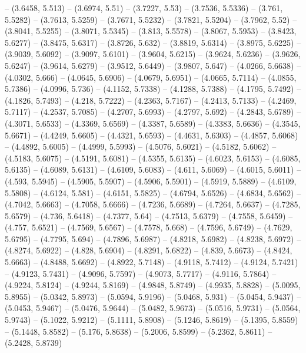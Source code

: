 {  -- (3.6458, 5.513) -- (3.6974, 5.51) -- (3.7227, 5.53) -- (3.7536, 5.5336) -- 
  (3.761, 5.5282) -- (3.7613, 5.5259) -- (3.7671, 5.5232) -- (3.7821, 5.5204) --
   (3.7962, 5.52) -- (3.8041, 5.5255) -- (3.8071, 5.5345) -- (3.813, 5.5578) -- 
  (3.8067, 5.5953) -- (3.8423, 5.6277) -- (3.8475, 5.6317) -- (3.8726, 5.632) --
   (3.8819, 5.6314) -- (3.8975, 5.6225) -- (3.9039, 5.6092) -- (3.9097, 5.6101) 
  -- (3.9604, 5.6215) -- (3.9624, 5.6236) -- (3.9626, 5.6247) -- (3.9614, 
  5.6279) -- (3.9512, 5.6449) -- (3.9807, 5.647) -- (4.0266, 5.6638) -- (4.0302,
   5.666) -- (4.0645, 5.6906) -- (4.0679, 5.6951) -- (4.0665, 5.7114) -- 
  (4.0855, 5.7386) -- (4.0996, 5.736) -- (4.1152, 5.7338) -- (4.1288, 5.7388) --
   (4.1795, 5.7492) -- (4.1826, 5.7493) -- (4.218, 5.7222) -- (4.2363, 5.7167) 
  -- (4.2413, 5.7133) -- (4.2469, 5.7117) -- (4.2537, 5.7085) -- (4.2707, 
  5.6993) -- (4.2797, 5.692) -- (4.2843, 5.6789) -- (4.3071, 5.6533) -- (4.3369,
   5.6569) -- (4.3387, 5.6589) -- (4.3383, 5.6636) -- (4.3545, 5.6671) -- 
  (4.4249, 5.6605) -- (4.4321, 5.6593) -- (4.4631, 5.6303) -- (4.4857, 5.6068) 
  -- (4.4892, 5.6005) -- (4.4999, 5.5993) -- (4.5076, 5.6021) -- (4.5182, 
  5.6062) -- (4.5183, 5.6075) -- (4.5191, 5.6081) -- (4.5355, 5.6135) -- 
  (4.6023, 5.6153) -- (4.6085, 5.6135) -- (4.6089, 5.6131) -- (4.6109, 5.6083) 
  -- (4.611, 5.6069) -- (4.6015, 5.6011) -- (4.593, 5.5945) -- (4.5905, 5.5907) 
  -- (4.5906, 5.5901) -- (4.5919, 5.5889) -- (4.6109, 5.5808) -- (4.6124, 5.581)
   -- (4.6151, 5.5825) -- (4.6794, 5.6526) -- (4.6834, 5.6562) -- (4.7042, 
  5.6663) -- (4.7058, 5.6666) -- (4.7236, 5.6689) -- (4.7264, 5.6637) -- 
  (4.7285, 5.6579) -- (4.736, 5.6418) -- (4.7377, 5.64) -- (4.7513, 5.6379) -- 
  (4.7558, 5.6459) -- (4.757, 5.6521) -- (4.7569, 5.6567) -- (4.7578, 5.668) -- 
  (4.7596, 5.6749) -- (4.7629, 5.6795) -- (4.7795, 5.694) -- (4.7896, 5.6987) --
   (4.8218, 5.6982) -- (4.8238, 5.6972) -- (4.8274, 5.6922) -- (4.828, 5.6904) 
  -- (4.8291, 5.6822) -- (4.839, 5.6673) -- (4.8424, 5.6663) -- (4.8488, 5.6692)
   -- (4.8922, 5.7148) -- (4.9118, 5.7412) -- (4.9124, 5.7421) -- (4.9123, 
  5.7431) -- (4.9096, 5.7597) -- (4.9073, 5.7717) -- (4.9116, 5.7864) -- 
  (4.9224, 5.8124) -- (4.9244, 5.8169) -- (4.9848, 5.8749) -- (4.9935, 5.8828) 
  -- (5.0095, 5.8955) -- (5.0342, 5.8973) -- (5.0594, 5.9196) -- (5.0468, 5.931)
   -- (5.0454, 5.9437) -- (5.0453, 5.9467) -- (5.0476, 5.9644) -- (5.0482, 
  5.9673) -- (5.0516, 5.9731) -- (5.0564, 5.9743) -- (5.1022, 5.9212) -- 
  (5.1111, 5.8908) -- (5.1246, 5.8619) -- (5.1395, 5.8559) -- (5.1448, 5.8582) 
  -- (5.176, 5.8638) -- (5.2006, 5.8599) -- (5.2362, 5.8611) -- (5.2428, 5.8739)
}
